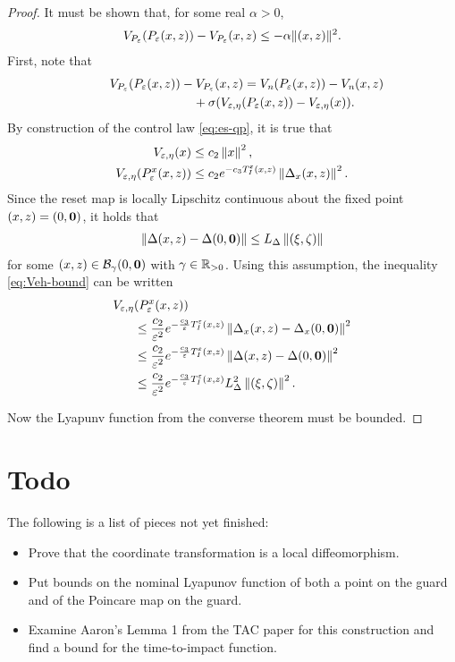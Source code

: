 \documentclass[twocolumn]{article}
\begin{document}
\begin{proof}
  It must be shown that, for some real $\alpha > 0$,
  \begin{align}
    V_{P_{\varepsilon}}(P_{\varepsilon}(x, z)) - V_{P_{\varepsilon}}(x, z) \leq -\alpha \| (x, z) \|^{2}.
  \end{align}
  First, note that
  \begin{align}
    \nonumber
    \lefteqn{\VP(\Pe(\zdx, \zdz)) - \VP(\zdx, \zdz) = \Vn(\Pe(\zdx, \zdz)) - \Vn(\zdx, \zdz)}\\
    &&\hspace{2cm}\mbox{} + \sigma(\Vee(\Pe(\zdx, \zdz)) - \Vee(\zdx)).
  \end{align}
  By construction of the control law \eqref{eq:es-qp}, it is true that
  \begin{align}
    \label{eq:Veh-bound}
    V_{\varepsilon, \eta}(x) &\leq c_{2} \left\| x \right\|^{2},\\
    \nonumber
    V_{\varepsilon, \eta}(P_{\varepsilon}^{x}(x, z)) &\leq c_{2} e^{-c_{3} T_{I}^{\varepsilon}(x, z)} \left\| \Delta_{x}(x, z) \right\|^{2}.
  \end{align}
  Since the reset map is locally Lipschitz continuous about the fixed point $(x, z) = (0, {\mathbf 0})$, it holds that
  \begin{align}
    \left\| \Delta(x, z) - \Delta(0, {\mathbf 0}) \right\| \leq L_{\Delta} \left\| (\xi, \zeta) \right\|
  \end{align}
  for some $(x, z) \in {\mathcal B}_{\gamma}(0, {\mathbf 0})$ with $\gamma \in \mathbb{R}_{> 0}$.
  Using this assumption, the inequality \eqref{eq:Veh-bound} can be written
  \begin{align}
    V_{\varepsilon, \eta}&(P_{\varepsilon}^{x}(x, z))\\
    \nonumber
    &\leq \frac{c_{2}}{\varepsilon^{2}} e^{-\frac{c_{3}}{\varepsilon} T_{I}^{\varepsilon}(x, z)} \left\| \Delta_{x}(x, z) - \Delta_{x}(0, {\mathbf 0}) \right\|^{2}\\
    \nonumber
    &\leq \frac{c_{2}}{\varepsilon^{2}} e^{-\frac{c_{3}}{\varepsilon} T_{I}^{\varepsilon}(x, z)} \left\| \Delta(x, z) - \Delta(0, {\mathbf 0}) \right\|^{2}\\
    \nonumber
    &\leq \frac{c_{2}}{\varepsilon^{2}} e^{-\frac{c_{3}}{\varepsilon} T_{I}^{\varepsilon}(x, z)} L_{\Delta}^{2} \left\| (\xi, \zeta) \right\|^{2}.
  \end{align}

  Now the Lyapunv function from the converse theorem must be bounded.
\end{proof}

\section*{Todo}
The following is a list of pieces not yet finished:
\begin{itemize}
\item Prove that the coordinate transformation is a local diffeomorphism.
\item Put bounds on the nominal Lyapunov function of both a point on the guard and of the Poincare map on the guard.
\item Examine Aaron's Lemma 1 from the TAC paper for this construction and find a bound for the time-to-impact function.
\end{itemize}
\end{document}
